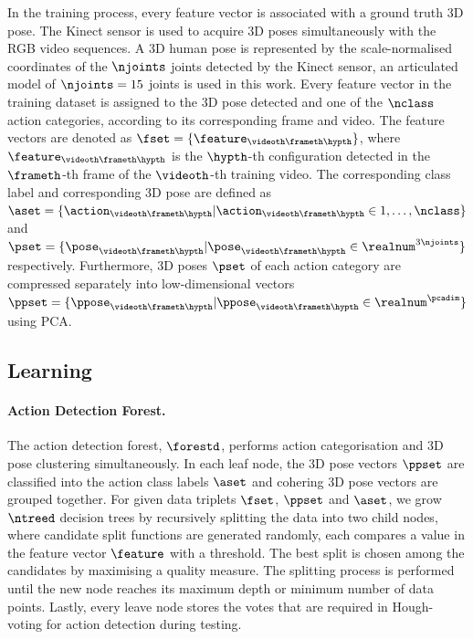 In the training process, every feature vector is associated with a ground truth 3D pose.
The Kinect sensor is used to acquire 3D poses simultaneously with the RGB video sequences. 
A 3D human pose is represented by the scale-normalised coordinates of the $\njoints$ joints detected by the Kinect sensor, an articulated model of $\njoints=15$ joints is used in this work. 
Every feature vector in the training dataset is assigned to the 3D pose detected and one of the $\nclass$ action categories, according to its corresponding frame and video. The feature vectors are denoted as $\fset = \{\feature_{\videoth\frameth\hypth}\}$, where $\feature_{\videoth\frameth\hypth}$ is the $\hypth$-th configuration detected in the $\frameth$-th frame of the $\videoth$-th training video. The corresponding class label and corresponding 3D pose
are defined as  $\aset = \{\action_{\videoth\frameth\hypth} | \action_{\videoth\frameth\hypth} \in 1,\dots,\nclass \}$ and $\pset = \{\pose_{\videoth\frameth\hypth} | \pose_{\videoth\frameth\hypth} \in \realnum^{3\njoints}\}$ respectively.  
Furthermore, 3D poses $\pset$ of each action category are compressed separately into low-dimensional vectors $\ppset = \{\ppose_{\videoth\frameth\hypth}  |  \ppose_{\videoth\frameth\hypth} \in \realnum^{\pcadim} \}$ using PCA. 







\subsection{Learning} 

\paragraph{Action Detection Forest.}
\label{sec/body/adflearn}
The action detection forest, $\forestd$, performs action categorisation and 3D pose clustering simultaneously. 
In each leaf node, the 3D pose vectors $\ppset$ are classified into the action class labels $\aset$ and cohering 3D pose vectors are grouped together.
For given data triplets $\fset$, $\ppset$ and $\aset$, we grow $\ntreed$ decision trees by recursively splitting the data into two child nodes, where candidate split functions are generated randomly, each compares a value in the feature vector $\feature$ with a threshold. The best split is chosen among the candidates by maximising a quality measure. The splitting process is performed until the new node reaches its maximum depth or minimum number of data points. Lastly, every leave node stores the votes that are required in Hough-voting for action detection during testing. 


